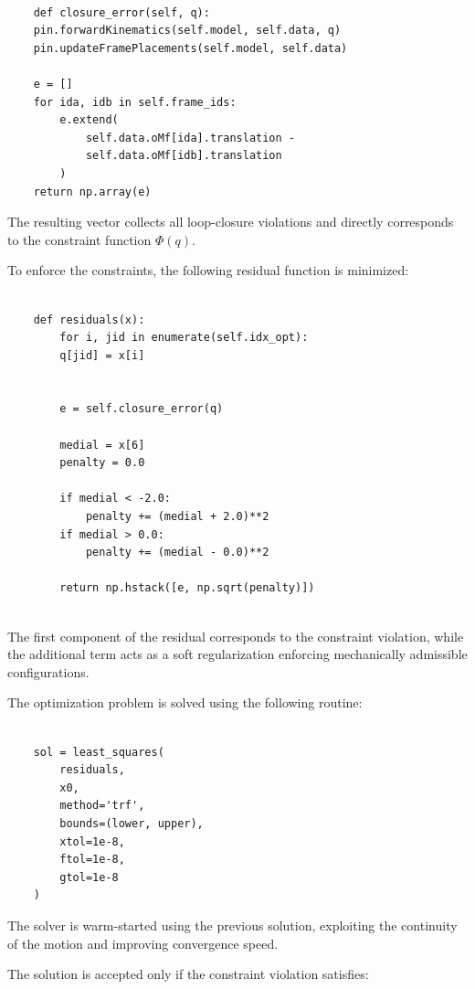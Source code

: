 \begin{verbatim}

    def closure_error(self, q):
    pin.forwardKinematics(self.model, self.data, q)
    pin.updateFramePlacements(self.model, self.data)

    e = []
    for ida, idb in self.frame_ids:
        e.extend(
            self.data.oMf[ida].translation -
            self.data.oMf[idb].translation
        )
    return np.array(e)

\end{verbatim}

The resulting vector collects all loop-closure violations and directly corresponds to the constraint function  $\Phi(q)$.

To enforce the constraints, the following residual function is minimized:

\begin{verbatim}

    def residuals(x):
        for i, jid in enumerate(self.idx_opt):
        q[jid] = x[i]

        
        e = self.closure_error(q)

        medial = x[6]
        penalty = 0.0

        if medial < -2.0:
            penalty += (medial + 2.0)**2
        if medial > 0.0:
            penalty += (medial - 0.0)**2

        return np.hstack([e, np.sqrt(penalty)])
        
\end{verbatim}

The first component of the residual corresponds to the constraint violation, while the additional term acts as a soft regularization enforcing mechanically admissible configurations.

The optimization problem is solved using the following routine:

\begin{verbatim}

    sol = least_squares(
        residuals,
        x0,
        method='trf',
        bounds=(lower, upper),
        xtol=1e-8,
        ftol=1e-8,
        gtol=1e-8
    )

\end{verbatim}

The solver is warm-started using the previous solution, exploiting the continuity of the motion and improving convergence speed.

The solution is accepted only if the constraint violation satisfies:

